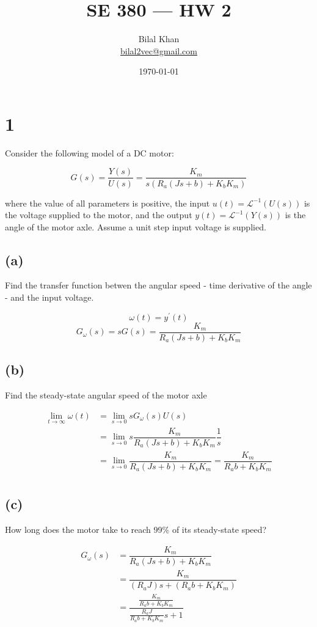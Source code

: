 \documentclass[11pt]{article}
\title{SE 380 — HW 2}
\author{Bilal Khan\\
\href{mailto:bilal2vec@gmail.com}{bilal2vec@gmail.com}}
\date{\today}
\begin{document}
\maketitle

\tableofcontents

\section{1}

Consider the following model of a DC motor:

\[ G(s) = \dfrac{Y(s)}{U(s)} = \dfrac{K_m}{s(R_a (Js + b) + K_b K_m)} \]

where the value of all parameters is positive, the input $u(t) = \mathcal{L}^{-1}(U(s))$ is the voltage supplied to the motor, and the output $y(t) = \mathcal{L}^{-1}(Y(s))$ is the angle of the motor axle. Assume a unit step input voltage is supplied. 

\subsection{(a)} Find the transfer function betwen the angular speed - time derivative of the angle - and the input voltage.

\[ \omega(t) = y^\prime(t) \]
\[  G_\omega(s) = s G(s) = \dfrac{K_m}{R_a (Js + b) + K_b K_m} \]

\subsection{(b)} Find the steady-state angular speed of the motor axle

\begin{align*}
  \lim_{t \xrightarrow{} \infty} \omega(t) &= \lim_{s \xrightarrow{} 0} s G_\omega(s) U(s) \\
  &= \lim_{s \xrightarrow{} 0} s \dfrac{K_m}{R_a (Js + b) + K_b K_m} \dfrac{1}{s} \\
  &= \lim_{s \xrightarrow{} 0} \dfrac{K_m}{R_a (Js + b) + K_b K_m} = \dfrac{K_m}{R_a b + K_b K_m} \\
\end{align*}

\subsection{(c)} How long does the motor take to reach 99\% of its steady-state speed?

\begin{align*}
  G_\omega(s) &= \dfrac{K_m}{R_a (Js + b) + K_b K_m} \\
  &= \dfrac{K_m}{(R_a J) s + (R_a b + K_b K_m)} \\
  &= \dfrac{\frac{K_m}{R_a b + K_b K_m}}{\frac{R_a J}{R_a b + K_b K_m} s + 1} \\
\end{align*}
\end{document}
